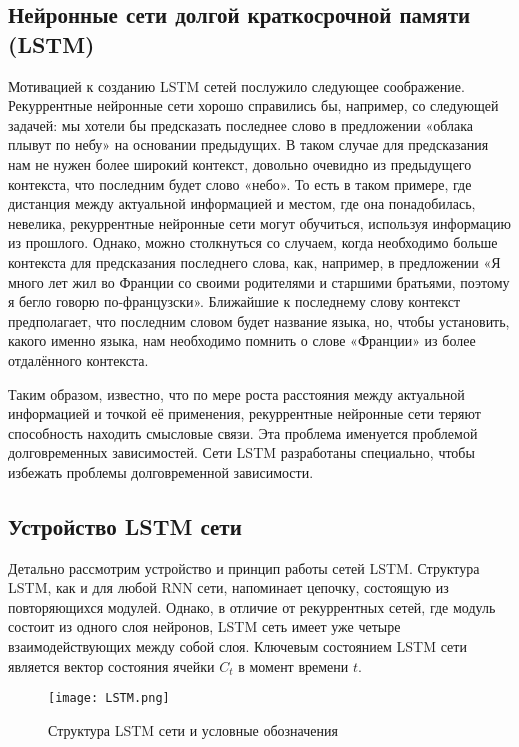 \documentclass{article}
\begin{document}
\subsection{Нейронные сети долгой краткосрочной памяти (LSTM)}
Мотивацией к созданию LSTM сетей послужило следующее соображение. Рекуррентные нейронные сети хорошо справились бы, например, со следующей задачей: мы
хотели бы предсказать последнее слово в предложении «облака плывут по небу» на
основании предыдущих. В таком случае для предсказания нам не нужен более широкий контекст, довольно очевидно из предыдущего контекста, что последним будет слово
«небо». То есть в таком примере, где дистанция между актуальной информацией и местом, где она понадобилась, невелика, рекуррентные нейронные сети могут обучиться,
используя информацию из прошлого. Однако, можно столкнуться со случаем, когда
необходимо больше контекста для предсказания последнего слова, как, например, в
предложении «Я много лет жил во Франции со своими родителями и старшими братьями, поэтому я бегло говорю по-французски». Ближайшие к последнему слову контекст
предполагает, что последним словом будет название языка, но, чтобы установить, какого именно языка, нам необходимо помнить о слове «Франции» из более отдалённого
контекста.

Таким образом, известно, что по мере роста расстояния между актуальной информацией и точкой её применения, рекуррентные нейронные сети теряют способность
находить смысловые связи. Эта проблема именуется проблемой долговременных зависимостей. Сети LSTM разработаны специально, чтобы избежать проблемы долговременной зависимости.

\subsection{Устройство LSTM сети}

Детально рассмотрим устройство и принцип работы сетей LSTM. Структура LSTM,
как и для любой RNN сети, напоминает цепочку, состоящую из повторяющихся модулей. Однако, в отличие от рекуррентных сетей, где модуль состоит из одного слоя нейронов, LSTM сеть имеет уже четыре взаимодействующих между собой слоя. Ключевым состоянием LSTM сети является вектор состояния ячейки $C_t$ в момент времени $t$.

\begin{figure}[H]
	
	        \texttt{[image: LSTM.png]}
	        \caption{ Структура LSTM сети и условные обозначения}
	    \end{figure}
\end{document}
